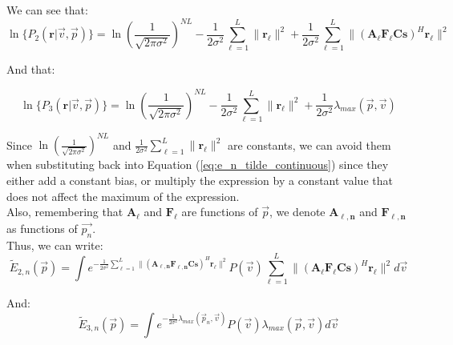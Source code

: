 \documentclass[10pt,a4paper]{report}
\begin{document}
We can see that:
\begin{equation}
\ln \{P_2(\mathbf{r}|\vec{v},\vec{p})\}  = 
\ln \left(\frac{1}{\sqrt{2 \pi \sigma^2}}\right)^{NL}
-
\frac{1}{2\sigma^2} \sum_{\ell=1}^L \|\mathbf{r_\ell}\|^2+
\frac{1}{2\sigma^2} \sum_{\ell=1}^L \|(\mathbf{A_\ell F_\ell C s})^H\mathbf{r_\ell}\|^2
\end{equation}

And that:

\begin{equation}
\ln \{P_3(\mathbf{r}|\vec{v},\vec{p})\}  = 
\ln \left(\frac{1}{\sqrt{2 \pi \sigma^2}}\right)^{NL}
-
\frac{1}{2\sigma^2}
\sum_{\ell=1}^L \|\mathbf{r_\ell}\|^2+
\frac{1}{2\sigma^2}\lambda_{max}(\vec{p},\vec{v})
\end{equation}

Since 
$\ln \left(\frac{1}{\sqrt{2 \pi \sigma^2}}\right)^{NL}$ and $
\frac{1}{2\sigma^2}\sum_{\ell=1}^L \|\mathbf{r_\ell}\|^2$ 
are constants, we can avoid them when substituting back into Equation (\ref{eq:e_n_tilde_continuous}) since they either add a constant bias, or multiply the expression by a constant value that does not affect the maximum of the expression.\\

Also, remembering that $\mathbf{A_{\ell}}$ and $\mathbf{F_{\ell}}$ are functions of $\vec{p}$, we denote $\mathbf{A_{\ell,n}}$ and $\mathbf{F_{\ell,n}}$ as functions of $\vec{p_n}$.\\

Thus, we can write:
\begin{equation}
\label{eq:e_2_n_tilde}
\tilde{E}_{2,n}(\vec{p})=
\int
e^{
-
\frac{1}{2\sigma^2} \sum_{\ell=1}^L \|(\mathbf{A_{\ell,n} F_{\ell,n} C s})^H\mathbf{r_\ell}\|^2
}
P(\vec{v})
\sum_{\ell=1}^L \|(\mathbf{A_\ell F_\ell C s})^H\mathbf{r_\ell}\|^2
d\vec{v}
\end{equation}

And:
\begin{equation}
\label{eq:e_3_n_tilde}
\tilde{E}_{3,n}(\vec{p})=
\int
e^{
-
\frac{1}{2\sigma^2} \lambda_{max}(\vec{p}_n,\vec{v})
}
P(\vec{v})
\lambda_{max}(\vec{p},\vec{v})
d\vec{v}
\end{equation}
\end{document}
